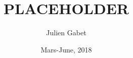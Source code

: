 \documentclass[a4paper,12pt]{article}
\title{PLACEHOLDER}
\author{Julien Gabet}
\date{Mars-June, 2018}
\begin{document}
\everymath{\displaystyle}

\maketitle










\end{document}
